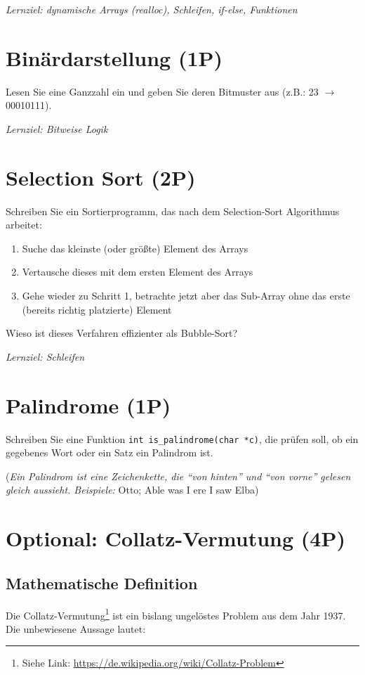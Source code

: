 \documentclass[
	ngerman,
	fontsize=10pt,
	parskip=half,
	titlepage=true,
	DIV=12
]{scrartcl}
\begin{document}
\emph{Lernziel: dynamische Arrays (realloc), Schleifen, if-else, Funktionen}

\section{Binärdarstellung (1P)}
Lesen Sie eine Ganzzahl ein und geben Sie deren Bitmuster aus (z.B.: 23 $\rightarrow$ 00010111).

\emph{Lernziel: Bitweise Logik}

\section{Selection Sort (2P)}
Schreiben Sie ein Sortierprogramm, das nach dem Selection-Sort Algorithmus arbeitet: 
\begin{enumerate}
\item Suche das kleinste (oder größte) Element des Arrays
\item Vertausche dieses mit dem ersten Element des Arrays
\item Gehe wieder zu Schritt 1, betrachte jetzt aber das Sub-Array ohne das erste (bereits richtig platzierte) Element
\end{enumerate}
Wieso ist dieses Verfahren effizienter als Bubble-Sort?

\emph{Lernziel: Schleifen}

\section{Palindrome (1P)}
Schreiben Sie eine Funktion \texttt{int is_palindrome(char *c)}, die prüfen soll, ob ein gegebenes Wort oder ein Satz ein Palindrom ist. 

(\emph{Ein Palindrom ist eine Zeichenkette, die \enquote{von hinten} und \enquote{von vorne} gelesen gleich aussieht. Beispiele:} Otto; Able was I ere I saw Elba)

\section{Optional: Collatz-Vermutung (4P)}
\subsection{Mathematische Definition}
Die Collatz-Vermutung\footnote{Siehe Link: \url{https://de.wikipedia.org/wiki/Collatz-Problem}} ist ein bislang ungelöstes Problem aus dem Jahr 1937. Die unbewiesene Aussage lautet:
\end{document}
